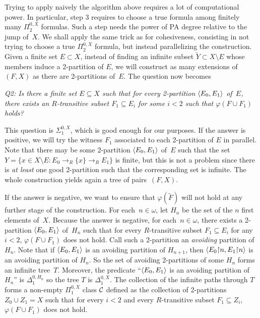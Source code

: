 Trying to apply naively the algorithm above requires a lot of computational power.
In particular, step 3 requires to choose a true formula among finitely many $\Pi^{0, X}_2$ formulas.
Such a step needs the power of PA degree relative to the jump of~$X$.
We shall apply the same trick as for cohesiveness, consisting in not trying to choose a true $\Pi^{0,X}_2$ formula,
but instead parallelizing the construction. Given a finite set $E \subset X$, 
instead of finding an infinite subset $\tilde{Y} \subset X \setminus E$
whose members induce a 2-partition of $E$, we will construct
as many extensions of $(F, X)$ as there are 2-partitions of~$E$. The question now becomes

\smallskip
{\itshape
Q2: Is there a finite set $E \subseteq X$ such that for every 2-partition $\left\langle E_0, E_1 \right\rangle$ of~$E$,
there exists an $R$-transitive subset $F_1 \subseteq E_i$ for some $i < 2$ such that $\varphi(F \cup F_1)$ holds?
}
\smallskip

This question is $\Sigma^{0,X}_1$, which is good enough for our purposes.
If the answer is positive, we will try the witness $F_1$ associated to each 2-partition of $E$ in parallel.
Note that there may be some 2-partition $\left\langle E_0, E_1 \right\rangle$ of~$E$
such that the set $Y = \{ x \in X \setminus E : E_0 \to_R \{x\} \to_R E_1 \}$ is finite,
but this is not a problem since there is \emph{at least}
one good 2-partition such that the corresponding set is infinite. 
The whole construction yields again a tree of pairs~$(F, X)$.

If the answer is negative, we want to ensure that
$\varphi(\tilde{F})$ will not hold at any further stage of the construction.
For each~$n \in \omega$, let $H_n$ be the set of the $n$ first elements of~$X$.
Because the answer is negative, for each~$n \in \omega$, there exists a 2-partition $\left\langle E_0, E_1 \right\rangle$
of~$H_n$ such that for every $R$-transitive subset $F_1 \subseteq E_i$ for any $i < 2$, $\varphi(F \cup F_1)$ does not hold.
Call such a 2-partition an \emph{avoiding} partition of $H_n$. 
Note that if $\left\langle E_0, E_1 \right\rangle$ is an avoiding partition of $H_{n+1}$, then $\left\langle E_0 {\upharpoonright} n, E_1 {\upharpoonright} n \right\rangle$
is an avoiding partition of $H_n$. So the set of avoiding 2-partitions of some $H_n$
forms an infinite tree~$T$. Moreover, the predicate ``$\left\langle E_0, E_1 \right\rangle$ is an avoiding partition of $H_n$''
is $\Delta^{0, H_n}_1$ so the tree $T$ is $\Delta^{0,X}_1$. The collection of the infinite paths through $T$
forms a non-empty $\Pi^{0,X}_1$ class $\mathcal{C}$ defined as the collection of 2-partitions $Z_0 \cup Z_1 = X$
such that for every $i < 2$ and every $R$-transitive subset $F_1 \subseteq Z_i$, $\varphi(F \cup F_1)$
does not hold.

